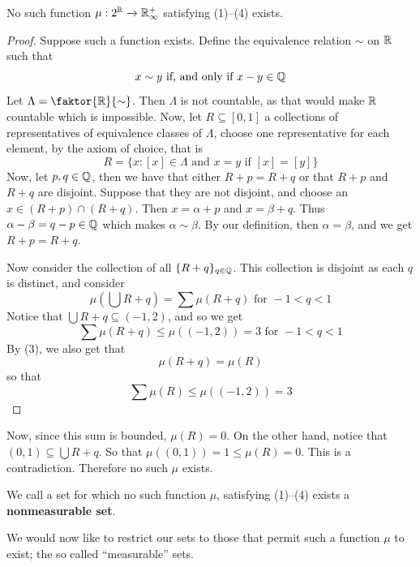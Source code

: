 \begin{theorem}\label{theorem_1}
    No such function $\mu:2^{\mathbb{R}} \xrightarrow{} \mathbb{R}^+_\infty$ satisfying (1)--(4)
    exists.
\end{theorem}
\begin{proof}
    Suppose such a function exists. Define the equivalence relation $\sim$ on
    $\mathbb{R}$ such that
    \begin{equation*}
        x \sim y \text{ if, and only if } x-y \in \mathbb{Q}
    \end{equation*}
    Let $\Lambda=\faktor{\R}{\sim}$. Then $\Lambda$ is not countable, as that
    would make $\mathbb{R}$ countable which is impossible. Now, let $R \subseteq [0,1]$
    a collections of representatives of equivalence classes of $\Lambda$, choose
    one representative for each element, by the axiom of choice, that is
    \begin{equation*}
    R=\{x : [x] \in \Lambda \text{ and } x=y \text{ if } [x]=[y]\}
    \end{equation*}
    Now, let $p,q \in \mathbb{Q}$, then we have that either  $R+p=R+q$ or that  $R+p$
    and  $R+q$ are disjoint. Suppose that they are not disjoint, and choose an
    $x \in (R+p) \cap (R+q)$. Then $x=\alpha+p$ and $x=\beta+q$. Thus
    $\alpha-\beta=q-p \in \mathbb{Q}$ which makes $\alpha \sim \beta$. By our
    definition, then  $\alpha=\beta$, and we get  $R+p=R+q$.

    Now consider the collection of all $\{R+q\}_{q \in \mathbb{Q}}$. This collection is
    disjoint as each $q$ is distinct, and consider
    \begin{equation*}
        \mu(\bigcup{R+q})=\sum{\mu(R+q)} \text{ for } -1<q<1
    \end{equation*}
    Notice that $\bigcup{R+q} \subseteq (-1,2)$, and so we get
    \begin{equation*}
        \sum{\mu(R+q)} \leq \mu((-1,2))=3 \text{ for } -1<q<1
    \end{equation*}
    By (3), we also get that
    \begin{equation*}
        \mu(R+q)=\mu(R)
    \end{equation*}
    so that
    \begin{equation*}
        \sum{\mu(R)} \leq \mu((-1,2))=3
    \end{equation*}
\end{proof}

Now, since this sum is bounded, $\mu(R)=0$. On the other hand, notice that
$(0,1) \subseteq \bigcup{R+q}$. So that $\mu((0,1))=1 \leq \mu(R)=0$. This is a
contradiction. Therefore no such $\mu$ exists.

\begin{definition}
    We call a set for which no such function $\mu$, satisfying (1)--(4) exists a
    \textbf{nonmeasurable set}.
\end{definition}

We would now like to restrict our sets to those that permit such a function
$\mu$ to exist; the so called ``measurable'' sets.
